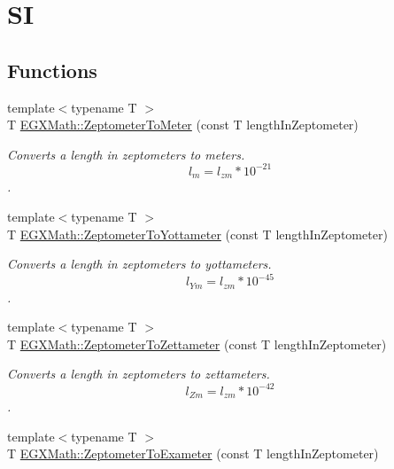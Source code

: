 \hypertarget{group___e_g_x_math-_conversions-_length_conversions-_zeptometer-_s_i}{}\section{SI}
\label{group___e_g_x_math-_conversions-_length_conversions-_zeptometer-_s_i}
\subsection*{Functions}
\begin{DoxyCompactItemize}
\item 
{\footnotesize template$<$typename T $>$ }\\T \mbox{\hyperlink{group___e_g_x_math-_conversions-_length_conversions-_zeptometer-_s_i_gaf51d88eb55e387d6ee07a02f2229be97}{E\+G\+X\+Math\+::\+Zeptometer\+To\+Meter}} (const T length\+In\+Zeptometer)
\begin{DoxyCompactList}\small\item\em Converts a length in zeptometers to meters. \[ l_{m}=l_{zm} * 10^{-21} \]. \end{DoxyCompactList}\item 
{\footnotesize template$<$typename T $>$ }\\T \mbox{\hyperlink{group___e_g_x_math-_conversions-_length_conversions-_zeptometer-_s_i_gaac70660b1e189b20afff8dcd02dfb105}{E\+G\+X\+Math\+::\+Zeptometer\+To\+Yottameter}} (const T length\+In\+Zeptometer)
\begin{DoxyCompactList}\small\item\em Converts a length in zeptometers to yottameters. \[ l_{Ym}=l_{zm} * 10^{-45} \]. \end{DoxyCompactList}\item 
{\footnotesize template$<$typename T $>$ }\\T \mbox{\hyperlink{group___e_g_x_math-_conversions-_length_conversions-_zeptometer-_s_i_ga73c5c0469d7d2aa9947293128c7aed73}{E\+G\+X\+Math\+::\+Zeptometer\+To\+Zettameter}} (const T length\+In\+Zeptometer)
\begin{DoxyCompactList}\small\item\em Converts a length in zeptometers to zettameters. \[ l_{Zm}=l_{zm} * 10^{-42} \]. \end{DoxyCompactList}\item 
{\footnotesize template$<$typename T $>$ }\\T \mbox{\hyperlink{group___e_g_x_math-_conversions-_length_conversions-_zeptometer-_s_i_ga28d70f8fb1a2876c4c8553348c78925d}{E\+G\+X\+Math\+::\+Zeptometer\+To\+Exameter}} (const T length\+In\+Zeptometer)

\end{DoxyCompactItemize}
